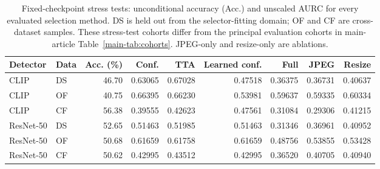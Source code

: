 \begin{table}[t]
\caption{Fixed-checkpoint stress tests: unconditional accuracy (Acc.) and unscaled AURC for every evaluated selection method. DS is held out from the selector-fitting domain; OF and CF are cross-dataset samples. These stress-test cohorts differ from the principal evaluation cohorts in main-article Table~\ref{main-tab:cohorts}. JPEG-only and resize-only are ablations.}
\label{tab:public}
\centering\small
\begin{tabular}{llrrrrrrr}
\toprule
Detector & Data & Acc. (\%) & Conf. & TTA & Learned conf. & Full & JPEG & Resize \\
\midrule
CLIP & DS & 46.70 & 0.63065 & 0.67028 & 0.47518 & 0.36375 & 0.36731 & 0.40637 \\
CLIP & OF & 40.75 & 0.66395 & 0.66230 & 0.53981 & 0.59637 & 0.59335 & 0.60334 \\
CLIP & CF & 56.38 & 0.39555 & 0.42623 & 0.47561 & 0.31084 & 0.29306 & 0.41215 \\
ResNet-50 & DS & 52.65 & 0.51463 & 0.51985 & 0.51463 & 0.31346 & 0.36961 & 0.40952 \\
ResNet-50 & OF & 50.68 & 0.61659 & 0.61758 & 0.61659 & 0.48756 & 0.53855 & 0.53428 \\
ResNet-50 & CF & 50.62 & 0.42995 & 0.43512 & 0.42995 & 0.36520 & 0.40705 & 0.40940 \\
\bottomrule
\end{tabular}
\end{table}

